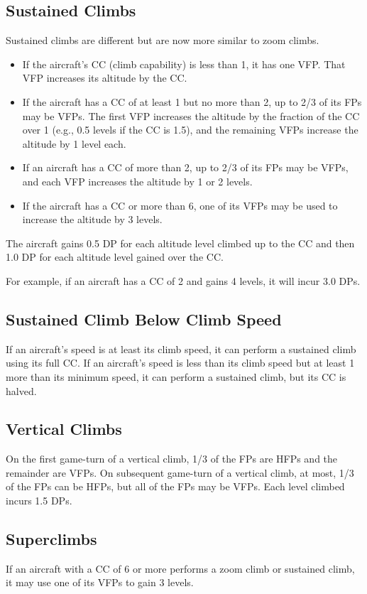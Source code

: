\documentclass[10pt]{article}
\begin{document}
\subsection{Sustained Climbs} Sustained climbs are different but are now more similar to zoom climbs. 
\begin{itemize}
    \item If the aircraft's CC (climb capability) is less than 1, it has one VFP. That VFP increases its altitude by the CC. 
    \item If the aircraft has a CC of at least 1 but no more than 2, up to 2/3 of its FPs may be VFPs. The first VFP increases the altitude by the fraction of the CC over 1 (e.g., 0.5 levels if the CC is 1.5), and the remaining VFPs increase the altitude by 1 level each. 
    \item If an aircraft has a CC of more than 2, up to 2/3 of its FPs may be VFPs, and each VFP increases the altitude by 1 or 2 levels.
    \item If the aircraft has a CC or more than 6, one of its VFPs may be used to increase the altitude by 3 levels.
\end{itemize}
The aircraft gains 0.5 DP for each altitude level climbed up to the CC and then 1.0 DP for each altitude level gained over the CC.

For example, if an aircraft has a CC of 2 and gains 4 levels, it will incur 3.0 DPs.

\subsection{Sustained Climb Below Climb Speed} If an aircraft's speed is at least its climb speed, it can perform a sustained climb using its full CC. If an aircraft's speed is less than its climb speed but at least 1 more than its minimum speed, it can perform a sustained climb, but its CC is halved.

\subsection{Vertical Climbs} On the first game-turn of a vertical climb, 1/3 of the FPs are HFPs and the remainder are VFPs. On subsequent game-turn of a vertical climb, at most, 1/3 of the FPs can be HFPs, but all of the FPs may be VFPs. Each level climbed incurs 1.5 DPs.

\subsection{Superclimbs} If an aircraft with a CC of 6 or more performs a zoom climb or sustained climb, it may use one of its VFPs to gain 3 levels.
\end{document}
